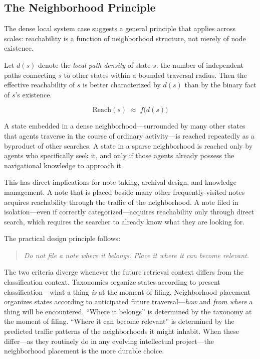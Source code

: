 \documentclass[12pt]{article}
\newcommand{\reach}{\mathrm{Reach}}
\begin{document}
\subsection{The Neighborhood Principle}

The dense local system case suggests a general principle that applies
across scales: reachability is a function of neighborhood structure,
not merely of node existence.

Let $d(s)$ denote the \emph{local path density} of state $s$: the number
of independent paths connecting $s$ to other states within a bounded
traversal radius.
Then the effective reachability of $s$ is better characterized by $d(s)$
than by the binary fact of $s$'s existence.

\[
  \reach(s) \;\approx\; f\bigl(d(s)\bigr)
\]

A state embedded in a dense neighborhood---surrounded by many other states
that agents traverse in the course of ordinary activity---is reached
repeatedly as a byproduct of other searches.
A state in a sparse neighborhood is reached only by agents who specifically
seek it, and only if those agents already possess the navigational knowledge
to approach it.

This has direct implications for note-taking, archival design, and
knowledge management.
A note that is placed beside many other frequently-visited notes acquires
reachability through the traffic of the neighborhood.
A note filed in isolation---even if correctly categorized---acquires
reachability only through direct search, which requires the searcher to
already know what they are looking for.

The practical design principle follows:
\begin{quote}
\textit{Do not file a note where it belongs. Place it where it can
become relevant.}
\end{quote}

The two criteria diverge whenever the future retrieval context differs
from the classification context.
Taxonomies organize states according to present classification---what
a thing \emph{is} at the moment of filing.
Neighborhood placement organizes states according to anticipated future
traversal---\emph{how} and \emph{from where} a thing will be encountered.
``Where it belongs'' is determined by the taxonomy at the moment of
filing.
``Where it can become relevant'' is determined by the predicted traffic
patterns of the neighborhoods it might inhabit.
When these differ---as they routinely do in any evolving intellectual
project---the neighborhood placement is the more durable choice.
\end{document}
